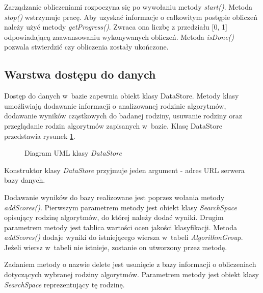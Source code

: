 \documentclass[../thesis.tex]{subfiles}
\begin{document}
Zarządzanie obliczeniami rozpoczyna się po wywołaniu metody \emph{start()}. Metoda \emph{stop()} wstrzymuje pracę. Aby uzyskać informacje o całkowitym postępie obliczeń należy użyć metody \emph{getProgress()}. Zwraca ona liczbę z przedziału [0, 1] odpowiadającą zaawansowaniu wykonywanych obliczeń. Metoda \emph{isDone()} pozwala stwierdzić czy obliczenia zostały ukończone.

\subsection{Warstwa dostępu do danych}

Dostęp do danych w~bazie zapewnia obiekt klasy DataStore. Metody klasy umożliwiają dodawanie informacji o analizowanej rodzinie algorytmów, dodawanie wyników cząstkowych do badanej rodziny, usuwanie rodziny oraz przeglądanie rodzin algorytmów zapisanych w~bazie. Klasę DataStore przedstawia rysunek \ref{proj:diagram_data_store}.

\begin{figure}[h]
\centering
{}
\caption{Diagram UML klasy \emph{DataStore}}
\label{proj:diagram_data_store}
\end{figure}

Konstruktor klasy \emph{DataStore} przyjmuje jeden argument - adres URL serwera bazy danych.

Dodawanie wyników do bazy realizowane jest poprzez wołania metody \emph{addScores()}. Pierwszym parametrem metody jest obiekt klasy \emph{SearchSpace} opisujący rodzinę algorytmów, do której należy dodać wyniki. Drugim parametrem metody jest tablica wartości ocen jakości klasyfikacji. Metoda \emph{addScores()} dodaje wyniki do istniejącego wiersza w~tabeli \emph{AlgorithmGroup}. Jeżeli wiersz w~tabeli nie istnieje, zostanie on utworzony przez metodę.

Zadaniem metody o nazwie delete jest usunięcie z bazy informacji o obliczeniach dotyczących wybranej rodziny algorytmów. Parametrem metody jest obiekt klasy \emph{SearchSpace} reprezentujący tę rodzinę.
\end{document}
